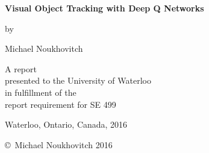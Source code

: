 \pagestyle{empty}

\begin{titlepage}
        \begin{center}
        \vspace*{1.0cm}

        \Huge
        {\bf Visual Object Tracking with Deep Q Networks }

        \vspace*{1.0cm}

        \normalsize
        by \\

        \vspace*{1.0cm}

        \Large
        Michael Noukhovitch \\

        \vspace*{3.0cm}

        \normalsize
        A report \\
        presented to the University of Waterloo \\ 
        in fulfillment of the \\
        report requirement for SE 499 \\

        \vspace*{2.0cm}

        Waterloo, Ontario, Canada, 2016 \\

        \vspace*{1.0cm}

        \copyright\ Michael Noukhovitch 2016 \\
        \end{center}
\end{titlepage}

\pagestyle{plain}
\setcounter{page}{2}

\cleardoublepage %
 



